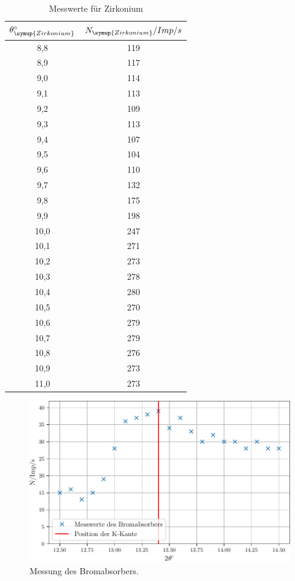 \begin{table}
  \centering
  \caption{Messwerte für Zirkonium}
  \label{tab:zirkonium}
  \begin{tabular}{c c}
    \toprule
    $\theta_{\symup{Zirkonium}}^{\circ}$ & $N_{\symup{Zirkonium}}/Imp/s$ \\
    \midrule
     8,8 & 119 \\
     8,9 & 117 \\
     9,0 & 114 \\
     9,1 & 113 \\
     9,2 & 109 \\
     9,3 & 113 \\
     9,4 & 107 \\
     9,5 & 104 \\
     9,6 & 110 \\
     9,7 & 132 \\
     9,8 & 175 \\
     9,9 & 198 \\
    10,0 & 247 \\
    10,1 & 271 \\
    10,2 & 273 \\
    10,3 & 278 \\
    10,4 & 280 \\
    10,5 & 270 \\
    10,6 & 279 \\
    10,7 & 279 \\
    10,8 & 276 \\
    10,9 & 273 \\
    11,0 & 273 \\
    \bottomrule
  \end{tabular}
\end{table}

\begin{figure}
  \centering
  \includegraphics{build/brom.pdf}
  \caption{Messung des Bromabsorbers.}
  \label{fig:brom}
\end{figure}

